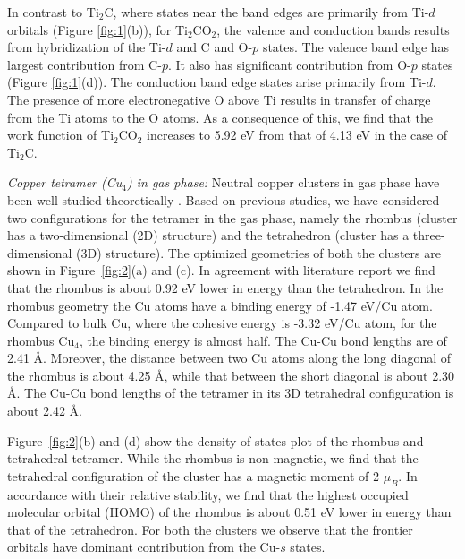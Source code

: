 In contrast to Ti$_2$C, where states near the band edges are primarily from Ti-$d$ orbitals (Figure \ref{fig:1}(b)), for Ti$_2$CO$_2$, the valence and conduction
bands results from hybridization of the Ti-$d$ and C and O-$p$ states. The
valence band edge has largest contribution from C-$p$. It also has significant contribution from O-$p$ states (Figure \ref{fig:1}(d)). The conduction band
edge states arise primarily from Ti-$d$. The presence of more electronegative O above 
Ti results in transfer of charge from the Ti atoms to the O atoms. As a consequence of this, we find that the work function of Ti$_2$CO$_2$ increases to 5.92 eV from that of 4.13 eV in the case of Ti$_2$C.


\noindent \textit{Copper tetramer (Cu$_4$) in gas phase:} Neutral copper clusters in gas phase have been well studied theoretically \cite{guvelioglu2006first, guvelioglu2005evolution, chaves2014role, calaminici1996density}. Based on previous studies, we have considered two configurations for the tetramer in the gas phase, namely the rhombus (cluster has a two-dimensional (2D) structure) and the tetrahedron 
(cluster has a three-dimensional (3D) structure). The optimized geometries of both the 
clusters are shown in Figure~\ref{fig:2}(a) and (c).
In agreement with literature report\cite{guvelioglu2006first} we find that the rhombus is about 0.92 eV lower in energy than the tetrahedron. In the rhombus geometry the Cu atoms have a binding energy of -1.47 eV/Cu atom. Compared to bulk Cu, where the cohesive energy is -3.32 eV/Cu atom, for the rhombus Cu$_4$, the binding energy is almost half. The Cu-Cu bond lengths are of 2.41 \AA. 
Moreover, the distance between two Cu atoms along the long diagonal of the rhombus is about 4.25 \AA, while that between the short diagonal is about 2.30 \AA. The Cu-Cu bond lengths of the tetramer in its 3D tetrahedral configuration is about 2.42 \AA.


Figure~\ref{fig:2}(b) and (d) show the density of states plot of the rhombus
and tetrahedral tetramer. While the rhombus is non-magnetic, we find that the tetrahedral
configuration of the cluster has a magnetic moment of  2 $\mu_B$. In accordance with their relative stability, we find that the highest occupied molecular orbital (HOMO) of the rhombus is about 0.51 eV lower in energy than that of the tetrahedron. For both the clusters we observe that the frontier orbitals have dominant contribution from the Cu-$s$ states.


